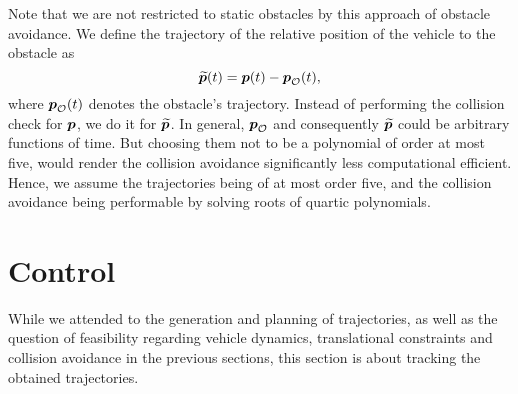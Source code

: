 Note that we are not restricted to static obstacles by this approach of obstacle avoidance. We define the trajectory of the relative position of the vehicle to the obstacle as
\begin{equation}
	\mbox{$\widetilde{\bm{p}}$}(t) = \mbox{$\bm{p}$}(t) - \mbox{$\bm{p}$}_{\mathcal{O}}(t)
	,
\end{equation}
where $\mbox{$\bm{p}$}_{\mathcal{O}}(t)$ denotes the obstacle's trajectory. Instead of performing the collision check for $\mbox{$\bm{p}$}$, we do it for $\mbox{$\widetilde{\bm{p}}$}$. In general, $\mbox{$\bm{p}$}_{\mathcal{O}}$ and consequently $\mbox{$\widetilde{\bm{p}}$}$ could be arbitrary functions of time.
But choosing them not to be a polynomial of order at most five, would render the collision avoidance significantly less computational efficient. Hence, we assume the trajectories being of at most order five, and the collision avoidance being performable by solving roots of quartic polynomials.




\section{Control}
\label{sec:control}
While we attended to the generation and planning of trajectories, as well as the question of feasibility regarding vehicle dynamics, translational constraints and collision avoidance in the previous sections, this section is about tracking the obtained trajectories.

